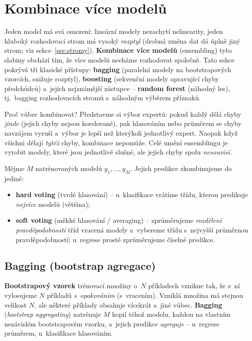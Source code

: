\section{Kombinace více modelů}\label{sec:kombinace}

Jeden model má svá omezení: lineární modely nezachytí nelinearity, jeden hluboký rozhodovací strom má vysoký \emph{rozptyl} (drobná změna dat dá úplně jiný strom; viz sekce~\ref{sec:stromy}). \textbf{Kombinace více modelů} (ensembling) tyto slabiny obchází tím, že více modelů necháme rozhodovat společně. Tato sekce pokrývá tři klasické přístupy: \textbf{bagging} (paralelní modely na bootstrapových vzorcích, snižuje rozptyl), \textbf{boosting} (sekvenční modely opravující chyby předchůdců) a~jejich nejznámější zástupce -- \textbf{random forest} (náhodný les), tj.\ bagging rozhodovacích stromů s~náhodným výběrem příznaků.

\begin{intuice}
Proč vůbec kombinovat? Představme si výbor expertů: pokud každý dělá chyby \emph{jinde} (jejich chyby nejsou korelované), pak hlasováním nebo průměrem se chyby navzájem vyruší a~výbor je lepší než kterýkoli jednotlivý expert. Naopak když všichni dělají \emph{tytéž} chyby, kombinace nepomůže. Celé umění ensemblingu je vyrobit modely, které jsou jednotlivě slušné, ale jejich chyby spolu \emph{nesouvisí}.
\end{intuice}

\begin{definice}
Mějme $M$ natrénovaných modelů $y_1,\dots,y_M$. Jejich predikce zkombinujeme do jediné:
\begin{itemize}
  \item \textbf{hard voting} (tvrdé hlasování) -- u~klasifikace vrátíme třídu, kterou predikuje \emph{nejvíce} modelů (většina);
  \item \textbf{soft voting} (měkké hlasování / averaging) -- zprůměrujeme \emph{rozdělení pravděpodobností} tříd vracená modely a~vybereme třídu s~nejvyšší průměrnou pravděpodobností; u~regrese prostě zprůměrujeme číselné predikce.
\end{itemize}
\end{definice}

\subsection{Bagging (bootstrap agregace)}

\begin{definice}
\textbf{Bootstrapový vzorek} trénovací množiny o~$N$ příkladech vznikne tak, že z~ní vylosujeme $N$ příkladů \emph{s~opakováním} (s~vracením). Vzniklá množina má stejnou velikost $N$, ale některé příklady obsahuje vícekrát a~jiné vůbec. \textbf{Bagging} (\emph{bootstrap aggregating}) natrénuje $M$ kopií téhož modelu, každou na vlastním nezávislém bootstrapovém vzorku, a~jejich predikce \emph{agreguje} -- u~regrese průměrem, u~klasifikace hlasováním.
\end{definice}

